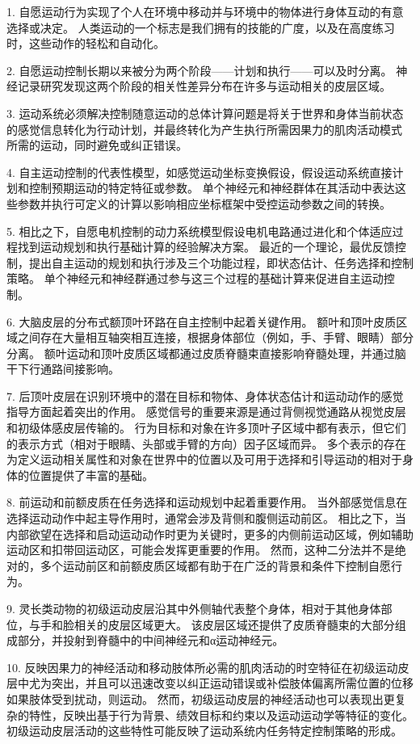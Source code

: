 1. 自愿运动行为实现了个人在环境中移动并与环境中的物体进行身体互动的有意选择或决定。 人类运动的一个标志是我们拥有的技能的广度，以及在高度练习时，这些动作的轻松和自动化。

2. 自愿运动控制长期以来被分为两个阶段——计划和执行——可以及时分离。 神经记录研究发现这两个阶段的相关性差异分布在许多与运动相关的皮层区域。

3. 运动系统必须解决控制随意运动的总体计算问题是将关于世界和身体当前状态的感觉信息转化为行动计划，并最终转化为产生执行所需因果力的肌肉活动模式 所需的运动，同时避免或纠正错误。

4. 自主运动控制的代表性模型，如感觉运动坐标变换假设，假设运动系统直接计划和控制预期运动的特定特征或参数。 单个神经元和神经群体在其活动中表达这些参数并执行可定义的计算以影响相应坐标框架中受控运动参数之间的转换。

5. 相比之下，自愿电机控制的动力系统模型假设电机电路通过进化和个体适应过程找到运动规划和执行基础计算的经验解决方案。 最近的一个理论，最优反馈控制，提出自主运动的规划和执行涉及三个功能过程，即状态估计、任务选择和控制策略。 单个神经元和神经群通过参与这三个过程的基础计算来促进自主运动控制。

6. 大脑皮层的分布式额顶叶环路在自主控制中起着关键作用。 额叶和顶叶皮质区域之间存在大量相互轴突相互连接，根据身体部位（例如，手、手臂、眼睛）部分分离。 额叶运动和顶叶皮质区域都通过皮质脊髓束直接影响脊髓处理，并通过脑干下行通路间接影响。

7. 后顶叶皮层在识别环境中的潜在目标和物体、身体状态估计和运动动作的感觉指导方面起着突出的作用。 感觉信号的重要来源是通过背侧视觉通路从视觉皮层和初级体感皮层传输的。 行为目标和对象在许多顶叶子区域中都有表示，但它们的表示方式（相对于眼睛、头部或手臂的方向）因子区域而异。 多个表示的存在为定义运动相关属性和对象在世界中的位置以及可用于选择和引导运动的相对于身体的位置提供了丰富的基础。

8. 前运动和前额皮质在任务选择和运动规划中起着重要作用。 当外部感觉信息在选择运动动作中起主导作用时，通常会涉及背侧和腹侧运动前区。 相比之下，当内部欲望在选择和启动运动动作时更为关键时，更多的内侧前运动区域，例如辅助运动区和扣带回运动区，可能会发挥更重要的作用。 然而，这种二分法并不是绝对的，多个运动前区和前额皮质区域都有助于在广泛的背景和条件下控制自愿行为。

9. 灵长类动物的初级运动皮层沿其中外侧轴代表整个身体，相对于其他身体部位，与手和脸相关的皮层区域更大。 该皮层区域还提供了皮质脊髓束的大部分组成部分，并投射到脊髓中的中间神经元和α运动神经元。

10. 反映因果力的神经活动和移动肢体所必需的肌肉活动的时空特征在初级运动皮层中尤为突出，并且可以迅速改变以纠正运动错误或补偿肢体偏离所需位置的位移 如果肢体受到扰动，则运动。 然而，初级运动皮层的神经活动也可以表现出更复杂的特性，反映出基于行为背景、绩效目标和约束以及运动运动学等特征的变化。 初级运动皮层活动的这些特性可能反映了运动系统内任务特定控制策略的形成。

